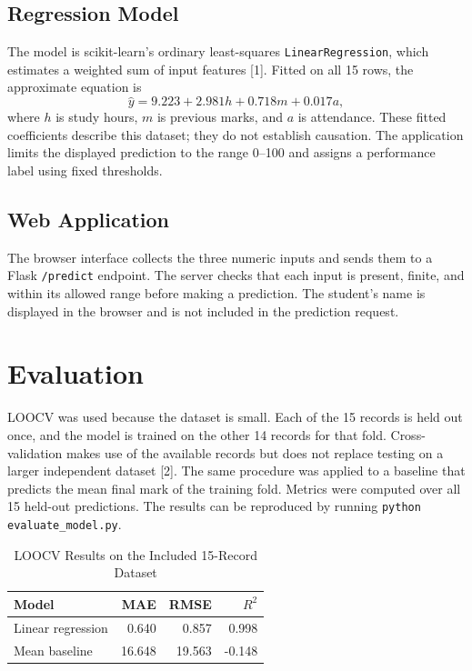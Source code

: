 \documentclass[conference]{IEEEtran}
\begin{document}
\subsection{Regression Model}
The model is scikit-learn's ordinary least-squares \texttt{LinearRegression},
which estimates a weighted sum of input features [1]. Fitted on all 15 rows,
the approximate equation is
\begin{equation}
\hat{y} = 9.223 + 2.981h + 0.718m + 0.017a,
\end{equation}
where $h$ is study hours, $m$ is previous marks, and $a$ is attendance.
These fitted coefficients describe this dataset; they do not establish
causation. The application limits the displayed prediction to the range
0--100 and assigns a performance label using fixed thresholds.

\subsection{Web Application}
The browser interface collects the three numeric inputs and sends them to a
Flask \texttt{/predict} endpoint. The server checks that each input is
present, finite, and within its allowed range before making a prediction.
The student's name is displayed in the browser and is not included in the
prediction request.

\section{Evaluation}
LOOCV was used because the dataset is small. Each of the 15 records is held
out once, and the model is trained on the other 14 records for that fold.
Cross-validation makes use of the available records but does not replace
testing on a larger independent dataset [2]. The same procedure was applied
to a baseline that predicts the mean final mark of the training fold. Metrics
were computed over all 15 held-out predictions. The results can be reproduced
by running \texttt{python evaluate\_model.py}.

\begin{table}[htbp]
\caption{LOOCV Results on the Included 15-Record Dataset}
\label{tab:results}
\centering
\begin{tabular}{lrrr}
\hline
Model & MAE & RMSE & $R^2$ \\
\hline
Linear regression & 0.640 & 0.857 & 0.998 \\
Mean baseline & 16.648 & 19.563 & -0.148 \\
\hline
\end{tabular}
\end{table}
\end{document}
